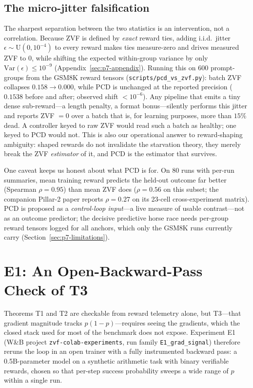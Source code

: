 \documentclass{article}
\providecommand{\eps}{\ensuremath{\epsilon}}
\begin{document}
\subsection{The micro-jitter falsification}
\label{sec:p7-jitter}
The sharpest separation between the two statistics is an intervention, not a
correlation. Because ZVF is defined by \emph{exact} reward ties, adding
i.i.d.\ jitter $\eps \sim \mathrm{U}(0, 10^{-4})$ to every reward makes ties
measure-zero and drives measured ZVF to $0$, while shifting the expected
within-group variance by only $\mathrm{Var}(\eps) \leq 10^{-9}$
(Appendix~\ref{sec:p7-appendix}). Running this on $600$ prompt-groups from
the GSM8K reward tensors (\texttt{scripts/pcd\_vs\_zvf.py}): batch ZVF
collapses $0.158 \to 0.000$, while PCD is unchanged at the reported
precision ($0.1538$ before and after; observed shift $< 10^{-6}$). Any
pipeline that emits a tiny dense sub-reward---a length penalty, a format
bonus---silently performs this jitter and reports ZVF $= 0$ over a batch
that is, for learning purposes, more than $15\%$ dead. A controller keyed to
raw ZVF would read such a batch as healthy; one keyed to PCD would not. This
is also our operational answer to reward-shaping ambiguity: shaped rewards
do not invalidate the starvation theory, they merely break the ZVF
\emph{estimator} of it, and PCD is the estimator that survives.

One caveat keeps us honest about what PCD is for. On $80$ runs with
per-run summaries, mean training reward predicts the held-out outcome far
better (Spearman $\rho = 0.95$) than mean ZVF does ($\rho = 0.56$ on this
subset; the companion Pillar-2 paper reports $\rho = 0.27$ on its 23-cell
cross-experiment matrix). PCD is proposed
as a \emph{control-loop input}---a live measure of usable contrast---not as
an outcome predictor; the decisive predictive horse race needs per-group
reward tensors logged for all anchors, which only the GSM8K runs currently
carry (Section~\ref{sec:p7-limitations}).
 \section{E1: An Open-Backward-Pass Check of T3}
\label{sec:p7-e1}
Theorems T1 and T2 are checkable from reward telemetry alone, but T3---that
gradient magnitude tracks $p(1-p)$---requires seeing the gradients, which
the closed stack used for most of the benchmark does not expose. Experiment
E1 (W\&B project \texttt{zvf-colab-experiments}, run family
\texttt{E1\_grad\_signal}) therefore reruns the loop in an open trainer with
a fully instrumented backward pass: a 0.5B-parameter model on a synthetic
arithmetic task with binary verifiable rewards, chosen so that per-step
success probability sweeps a wide range of $p$ within a single run.
\end{document}
